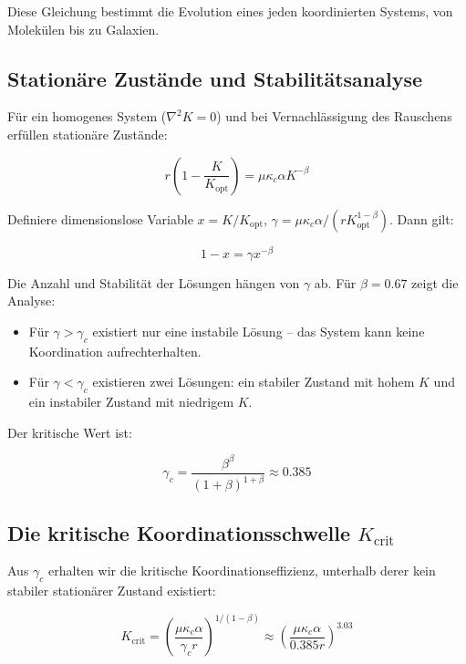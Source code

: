 \documentclass[12pt,a4paper]{article}
\theoremstyle{remark}
\newcommand{\Keffopt}{K_{\mathrm{opt}}}
\newcommand{\Keffcrit}{K_{\mathrm{crit}}}
\newcommand{\kappac}{\kappa_c}
\begin{document}
	Diese Gleichung bestimmt die Evolution eines jeden koordinierten Systems, von Molekülen bis zu Galaxien.
	
	\subsection{Stationäre Zustände und Stabilitätsanalyse}
	
	Für ein homogenes System ($\nabla^2 K = 0$) und bei Vernachlässigung des Rauschens erfüllen stationäre Zustände:
	
	\begin{equation}
		r \left(1 - \frac{K}{\Keffopt}\right) = \mu \kappac \alpha K^{-\beta}
		\label{eq:stationary}
	\end{equation}
	
	Definiere dimensionslose Variable $x = K/\Keffopt$, $\gamma = \mu \kappac \alpha / (r \Keffopt^{1-\beta})$. Dann gilt:
	
	\begin{equation}
		1 - x = \gamma x^{-\beta}
		\label{eq:dimensionless}
	\end{equation}
	
	Die Anzahl und Stabilität der Lösungen hängen von $\gamma$ ab. Für $\beta = 0.67$ zeigt die Analyse:
	
	\begin{itemize}
		\item Für $\gamma > \gamma_c$ existiert nur eine instabile Lösung – das System kann keine Koordination aufrechterhalten.
		\item Für $\gamma < \gamma_c$ existieren zwei Lösungen: ein stabiler Zustand mit hohem $K$ und ein instabiler Zustand mit niedrigem $K$.
	\end{itemize}
	
	Der kritische Wert ist:
	
	\begin{equation}
		\gamma_c = \frac{\beta^{\beta}}{(1+\beta)^{1+\beta}} \approx 0.385
		\label{eq:gamma_c}
	\end{equation}
	
	\subsection{Die kritische Koordinationsschwelle $\Keffcrit$}
	
	Aus $\gamma_c$ erhalten wir die kritische Koordinationseffizienz, unterhalb derer kein stabiler stationärer Zustand existiert:
	
	\begin{equation}
		\Keffcrit = \left( \frac{\mu \kappac \alpha}{\gamma_c r} \right)^{1/(1-\beta)} \approx \left( \frac{\mu \kappac \alpha}{0.385 r} \right)^{3.03}
		\label{eq:Kcrit}
	\end{equation}
	
\end{document}
